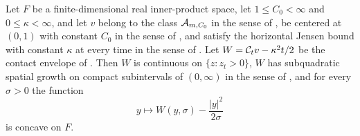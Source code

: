 \begin{lemma}
Let $F$ be a finite-dimensional real inner-product space, let $1\le C_0<\infty$ and
$0\le\kappa<\infty$, and let $v$ belong to the class $\mathcal{A}_{m,C_0}$ in the sense of
, be centered at $(0,1)$ with constant $C_0$ in the sense of
, and satisfy the horizontal Jensen bound with constant $\kappa$ at
every time in the sense of . Let
$W=\mathcal{C}_tv-\kappa^2t/2$ be the contact envelope of . Then $W$ is
continuous on $\{z:z_t>0\}$, $W$ has subquadratic spatial growth on compact
subintervals of $(0,\infty)$ in the sense of , and for every
$\sigma>0$ the function
\[
  y\longmapsto W(y,\sigma)-\frac{|y|^2}{2\sigma}
\]
is concave on $F$.
\end{lemma}
